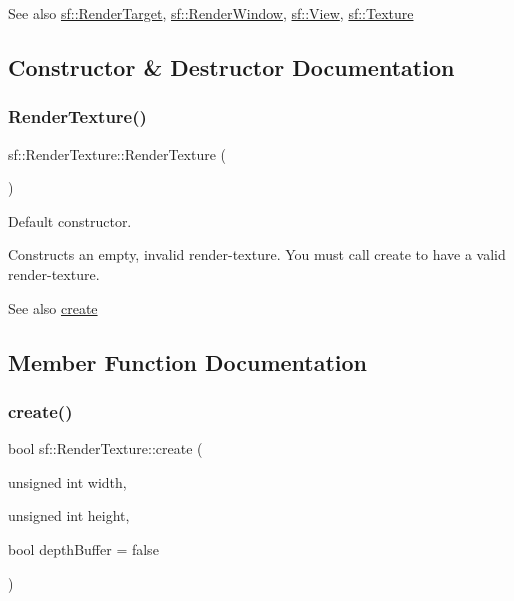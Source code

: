 \begin{DoxySeeAlso}{See also}
\hyperlink{classsf_1_1_render_target}{sf\+::\+Render\+Target}, \hyperlink{classsf_1_1_render_window}{sf\+::\+Render\+Window}, \hyperlink{classsf_1_1_view}{sf\+::\+View}, \hyperlink{classsf_1_1_texture}{sf\+::\+Texture} 
\end{DoxySeeAlso}


\subsection{Constructor \& Destructor Documentation}
\mbox{\label{classsf_1_1_render_texture_a19ee6e5b4c40ad251803389b3953a9c6}} 
\subsubsection{\texorpdfstring{Render\+Texture()}{RenderTexture()}}
{\footnotesize\ttfamily sf\+::\+Render\+Texture\+::\+Render\+Texture (\begin{DoxyParamCaption}{ }\end{DoxyParamCaption})}



Default constructor. 

Constructs an empty, invalid render-\/texture. You must call create to have a valid render-\/texture.

\begin{DoxySeeAlso}{See also}
\hyperlink{classsf_1_1_render_texture_aefbb76eb3b87e368ab974b2660931ccb}{create} 
\end{DoxySeeAlso}


\subsection{Member Function Documentation}
\mbox{\label{classsf_1_1_render_texture_aefbb76eb3b87e368ab974b2660931ccb}} 
\subsubsection{\texorpdfstring{create()}{create()}}
{\footnotesize\ttfamily bool sf\+::\+Render\+Texture\+::create (\begin{DoxyParamCaption}\item[{unsigned int}]{width,  }\item[{unsigned int}]{height,  }\item[{bool}]{depth\+Buffer = {\ttfamily false} }\end{DoxyParamCaption})}



